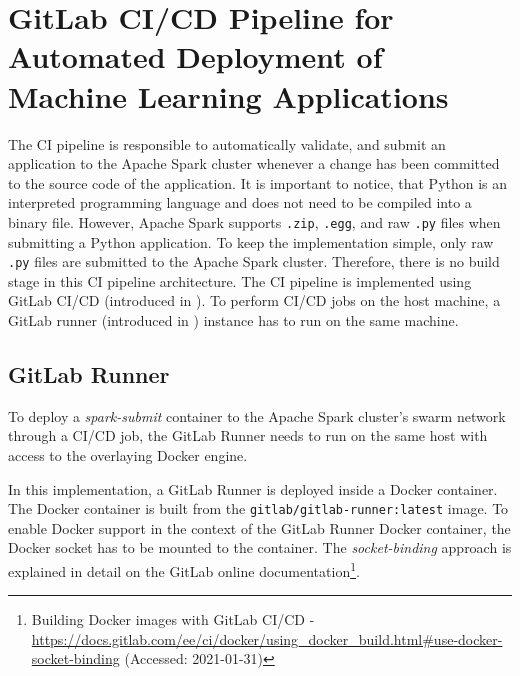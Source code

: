 \section{GitLab CI/CD Pipeline for Automated Deployment of Machine Learning Applications}
\label{sec:06_pipeline}
%
The CI pipeline is responsible to automatically validate, and submit an application to the Apache Spark cluster whenever a change has been committed to the source code of the application.
It is important to notice, that Python is an interpreted programming language and does not need to be compiled into a binary file. However, Apache Spark supports \texttt{.zip}, \texttt{.egg}, and raw \texttt{.py} files when submitting a Python application. To keep the implementation simple, only raw \texttt{.py} files are submitted to the Apache Spark cluster. Therefore, there is no build stage in this CI pipeline architecture.
%
The CI pipeline is implemented using GitLab CI/CD (introduced in ).
%
To perform CI/CD jobs on the host machine, a GitLab runner (introduced in ) instance has to run on the same machine.


\subsection{GitLab Runner}
\label{subsec:06_pipeline_runner}
To deploy a \textit{spark-submit} container to the Apache Spark cluster's swarm network through a CI/CD job, the GitLab Runner needs to run on the same host with access to the overlaying Docker engine.


In this implementation, a GitLab Runner is deployed inside a Docker container.
The Docker container is built from the \texttt{gitlab/gitlab-runner:latest} image.
To enable Docker support in the context of the GitLab Runner Docker container, the Docker socket has to be mounted to the container. The \textit{socket-binding} approach is explained in detail on the GitLab online documentation\footnote{Building Docker images with GitLab CI/CD  - \url{https://docs.gitlab.com/ee/ci/docker/using_docker_build.html\#use-docker-socket-binding} (Accessed: 2021-01-31)}.


